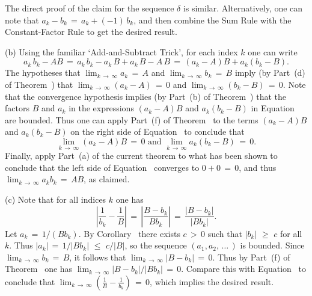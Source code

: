         The direct proof of the claim for the sequence ${\delta}$ is similar. Alternatively, one can note that $a_{k}-b_{k} \,=\, a_{k} + (-1)\,b_{k}$,
	and then combine the Sum Rule with the Constant-Factor Rule to get the desired result.

\V

        (b) Using the familiar `Add-and-Subtract Trick', for each index $k$ one can write
        \begin{equation} 
        \label{EqnC.80}
        a_{k}\,b_{k}-AB \,=\, a_{k}\,b_{k} - a_{k}\,B + a_{k}\,B - A\,B \,=\, (a_{k}-A)B + a_{k}(b_{k}-B).
        \end{equation}
    The hypotheses that $\lim_{k \,{\rightarrow}\, {\infty}} a_{k} \,=\, A$ and $\lim_{k \,{\rightarrow}\, {\infty}} b_{k} \,=\, B$ imply (by Part~(d) of Theorem~) that $\lim_{k \,{\rightarrow}\, {\infty}} (a_{k}-A) \,=\, 0$ and $\lim_{k \,{\rightarrow}\, {\infty}} (b_{k}-B) \,=\, 0$.
    Note that the convergence hypothesis implies (by Part~(b) of Theorem~)
    that the factors $B$ and $a_{k}$ in the expressions $(a_{k}-A)B$ and $a_{k}(b_{k}-B)$ in Equation~ are bounded.
    Thus one can apply Part~(f) of Theorem~ to the terms $(a_{k}-A)B$ and $a_{k}(b_{k}-B)$ on the right side of Equation~ to conclude that
        \begin{displaymath}
        \lim_{k \,{\rightarrow}\, {\infty}} (a_{k}-A)B \,=\, 0 \mbox{ and }
        \lim_{k \,{\rightarrow}\, {\infty}} a_{k}(b_{k}-B) \,=\, 0.
        \end{displaymath}
    Finally, apply Part~(a) of the current theorem to what has been shown to conclude that
    the left side of Equation~ converges to $0+0 \,=\, 0$, and thus $\lim_{k \,{\rightarrow}\, {\infty}} a_{k}b_{k} \,=\, AB$, as claimed.

\V

        (c) Note that for all indices $k$ one has
        \begin{equation} 
        \label{EqnC.90}
        \left|\frac{1}{b_{k}}-\frac{1}{B}\right| \,=\, 
        \left|\frac{B-b_{k}}{Bb_{k}}\right| \,=\, \frac{|B-b_{k}|}{|Bb_{k}|}.
        \end{equation}
    Let $a_{k} \,=\, 1/(Bb_{k})$. By Corollary~ there exists $c\,>\,0$ such that $|b_{k}|\,\,{\geq}\,\,c$ for all $k$.
    Thus $|a_{k}| \,=\, 1/|Bb_{k}|\,\,{\leq}\,\,c/|B|$, so the sequence $(a_{1},a_{2},\,{\ldots}\,)$ is bounded.
    Since $\lim_{k \,{\rightarrow}\, {\infty}} b_{k} \,=\, B$, it follows that $\lim_{k \,{\rightarrow}\, {\infty}} |B-b_{k}| \,=\, 0$.
    Thus by Part~(f) of Theorem~ one has $\lim_{k \,{\rightarrow}\, {\infty}} |B-b_{k}|/|Bb_{k}| \,=\, 0$.
    Compare this with Equation~ to conclude that $\lim_{k \,{\rightarrow}\, {\infty}} {\displaystyle \left(\frac{1}{B}-\frac{1}{b_{k}} \right)}\,=\, 0$, which implies the desired result.

